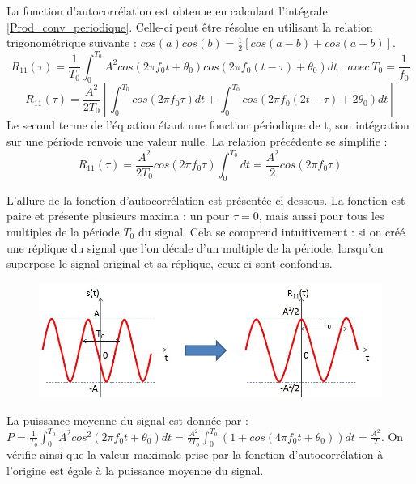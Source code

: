	La fonction d'autocorrélation est obtenue en calculant l'intégrale \ref{Prod_conv_periodique}. Celle-ci peut être résolue en utilisant la relation trigonométrique suivante : $cos(a)cos(b)=\frac{1}{2}[cos(a-b)+cos(a+b)]$.
	\begin{equation*}
	R_{11}(\tau)=\frac{1}{T_{0}}\int_{0}^{T_{0}}A^{2}cos(2\pi f_{0}t+\theta_{0})cos(2\pi f_{0}(t-\tau)+\theta_{0})dt~,~avec~T_{0}=\frac{1}{f_{0}}
	\end{equation*}
	\begin{equation*}
	R_{11}(\tau)=\frac{A^{2}}{2T_{0}}[\int_{0}^{T_{0}}cos(2\pi f_{0}\tau)dt+\int_{0}^{T_{0}}cos(2\pi f_{0}(2t-\tau)+2\theta_{0})dt]
	\end{equation*}
	Le second terme de l'équation étant une fonction périodique de t, son intégration sur une période renvoie une valeur nulle. La relation précédente se simplifie :
	\begin{equation*}
	R_{11}(\tau)=\frac{A^{2}}{2T_{0}}cos(2\pi f_{0}\tau)\int_{0}^{T_{0}}dt=\frac{A^{2}}{2}cos(2\pi f_{0}\tau)
	\end{equation*}
	
	L'allure de la fonction d'autocorrélation est présentée ci-dessous. La fonction est paire et présente plusieurs maxima : un pour $\tau=0$, mais aussi pour tous les multiples de la période $T_{0}$ du signal. Cela se comprend intuitivement : si on créé une réplique du signal que l'on décale d'un multiple de la période, lorsqu'on superpose le signal original et sa réplique, ceux-ci sont confondus. 
	\begin{figure}[h!]
		\centering
		\includegraphics[scale=0.6]{images/autocorr_cosinus.jpg}
	\end{figure}
	
	La puissance moyenne du signal est donnée par : $\overline{P}=\frac{1}{T_{0}}\int_{0}^{T_{0}}A^{2}cos^{2}(2\pi f_{0}t+\theta_{0})dt=\frac{A^{2}}{2T_{0}}\int_{0}^{T_{0}}(1+cos(4\pi f_{0}t+\theta_{0}))dt=\frac{A^{2}}{2}$. On vérifie ainsi que la valeur maximale prise par la fonction d'autocorrélation à l'origine est égale à la puissance moyenne du signal.

